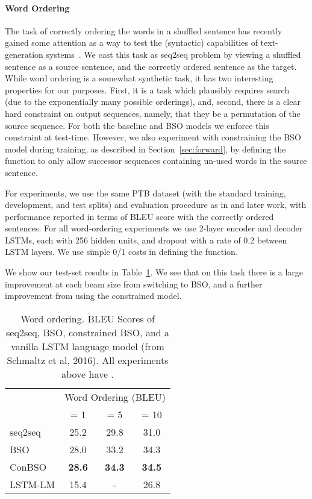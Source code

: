 \documentclass[11pt,letterpaper]{article}
\begin{document}
\paragraph{Word Ordering}
The task of correctly ordering the words in a shuffled sentence has recently gained some
attention as a way to test the (syntactic) capabilities of
text-generation
systems~\cite{zhang11syntax,zhang15discriminative,liu15transition,schmaltz16word}. 
We cast this task as seq2seq problem by viewing a shuffled sentence as
a source sentence, and the correctly ordered sentence as the
target. While word ordering is a somewhat synthetic task, it has two interesting properties for our purposes. First, it is a task which plausibly requires search (due to the exponentially many possible orderings), and, second, there is a clear hard constraint on output sequences, namely, that they be a permutation of the source sequence. For both the baseline and BSO models we
enforce this constraint at test-time. However, we also experiment with
constraining the BSO model during training, as described in Section~\ref{sec:forward}, by defining the  function to only allow successor sequences containing un-used words in the source sentence.

For experiments, we use the same PTB dataset (with the standard training,
development, and test splits) and evaluation procedure as in
 and later work, with performance reported in terms of BLEU
score with the correctly ordered sentences. For all word-ordering
experiments we use 2-layer encoder and decoder LSTMs, each with 256
hidden units, and dropout with a rate of 0.2 between LSTM layers. We use simple 0/1 costs in defining the  function.  

We show our test-set results
in Table~\ref{tab:wo}. We see that on this task there is a large improvement at 
each beam size from switching to BSO, and a further improvement from using 
the constrained model.

\begin{table}
  \centering
  \begin{tabular}{lccc}
    \toprule
     & \multicolumn{3}{c}{Word Ordering (BLEU) } \\ 
          &  = 1 &  = 5 &  = 10 \\ 
    \midrule
    seq2seq & 25.2 & 29.8 & 31.0 \\
    BSO     & 28.0 & 33.2 & 34.3 \\
    ConBSO & \textbf{28.6} & \textbf{34.3} & \textbf{34.5} \\
    \midrule
    LSTM-LM & 15.4 &  - & 26.8 \\
    \bottomrule
  \end{tabular}
  \caption{Word ordering. BLEU Scores of seq2seq, BSO, constrained BSO, and a vanilla LSTM language model (from Schmaltz et al, 2016). All experiments above have .}
  \label{tab:wo}
\end{table}
\end{document}
